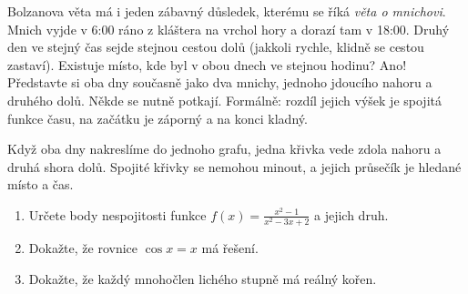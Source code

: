 \begin{note}
  Bolzanova věta má i jeden zábavný důsledek, kterému se říká \textit{věta o mnichovi}. Mnich vyjde v 6:00 ráno z kláštera na vrchol hory a dorazí tam v 18:00. Druhý den ve stejný čas sejde stejnou cestou dolů (jakkoli rychle, klidně se cestou zastaví). Existuje místo, kde byl v obou dnech ve stejnou hodinu? Ano! Představte si oba dny současně jako dva mnichy, jednoho jdoucího nahoru a druhého dolů. Někde se nutně potkají. Formálně: rozdíl jejich výšek je spojitá funkce času, na začátku je záporný a na konci kladný.

  \begin{center}
  \end{center}
  Když oba dny nakreslíme do jednoho grafu, jedna křivka vede zdola nahoru a druhá shora dolů. Spojité křivky se nemohou minout, a jejich průsečík je hledané místo a čas.
\end{note}

\begin{problem}
  \begin{enumerate}[label=(\alph*)]
    \item Určete body nespojitosti funkce $f(x) = \frac{x^2 - 1}{x^2 - 3x + 2}$ a jejich druh.
    \item Dokažte, že rovnice $\cos x = x$ má řešení.
    \item Dokažte, že každý mnohočlen lichého stupně má reálný kořen.
  \end{enumerate}
\end{problem}

